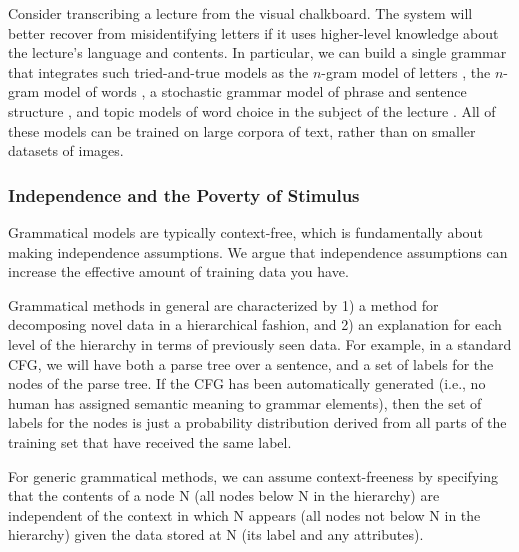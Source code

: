 \documentclass{article}
\begin{document}
Consider transcribing a lecture from the visual chalkboard. The system
will better recover from misidentifying letters if it uses
higher-level knowledge about the lecture's language and contents. In
particular, we can build a single grammar that integrates such
tried-and-true models as the $n$-gram model of letters
\cite{manning-schutze}, the $n$-gram model of words
\cite{manning-schutze}, a stochastic grammar model of phrase and
sentence structure \cite{manning-schutze}, and topic models of word
choice in the subject of the lecture \cite{lda}. All of these models
can be trained on large corpora of text, rather than on smaller
datasets of images.



\subsubsection{Independence and the Poverty of Stimulus}

Grammatical models are typically context-free, which is fundamentally
about making independence assumptions. We argue that independence
assumptions can increase the effective amount of training data you
have.

\begin{rem}
Grammatical methods in general are characterized by 1) a method for
decomposing novel data in a hierarchical fashion, and 2) an
explanation for each level of the hierarchy in terms of previously
seen data. For example, in a standard CFG, we will have both a parse
tree over a sentence, and a set of labels for the nodes of the parse
tree. If the CFG has been automatically generated (i.e., no human has
assigned semantic meaning to grammar elements), then the set of labels
for the nodes is just a probability distribution derived from all
parts of the training set that have received the same label. 

For generic grammatical methods, we can assume context-freeness by
specifying that the contents of a node N (all nodes below N in the
hierarchy) are independent of the context in which N appears (all
nodes not below N in the hierarchy) given the data stored at N (its
label and any attributes).
\end{rem}
\end{document}
